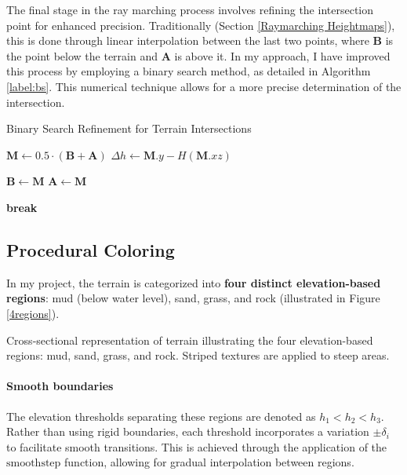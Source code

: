 The final stage in the ray marching process involves refining the intersection point for enhanced precision. Traditionally (Section \ref{Raymarching Heightmaps}), this is done through linear interpolation between the last two points, where  $\mathbf{B}$ is the point below the terrain and $\mathbf{A}$ is above it. In my approach, I have improved this process by employing a binary search method, as detailed in Algorithm \ref{label:bs}. This numerical technique allows for a more precise determination of the intersection.

\begin{algorithm}
\caption{Binary Search Refinement for Terrain Intersections}
\label{label:bs}
\begin{algorithmic}
        \State $\mathbf{M} \gets 0.5 \cdot (\mathbf{B} + \mathbf{A})$
        \State $\Delta h \gets \mathbf{M}.y - H(\mathbf{M}.xz)$

            \State $\mathbf{B} \gets \mathbf{M}$
        \Else
            \State $\mathbf{A} \gets \mathbf{M}$
        \EndIf

            \State \textbf{break}
        \EndIf
    \EndFor
\EndFunction
\end{algorithmic}
\end{algorithm}


\subsection{Procedural Coloring}
\label{Terrain Procedural Texturing}

In my project, the terrain is categorized into \textbf{four distinct elevation-based regions}: mud (below water level), sand, grass, and rock (illustrated in Figure \ref{4regions}).

{Cross-sectional representation of terrain illustrating the four elevation-based regions: mud, sand, grass, and rock. Striped textures are applied to steep areas.}

\paragraph{Smooth boundaries}
The elevation thresholds separating these regions are denoted as $h_{1} < h_{2} < h_{3}$. Rather than using rigid boundaries, each threshold incorporates a variation $\pm \delta_i$ to facilitate smooth transitions. This is achieved through the application of the $\text{smoothstep}$ function, allowing for gradual interpolation between regions.

